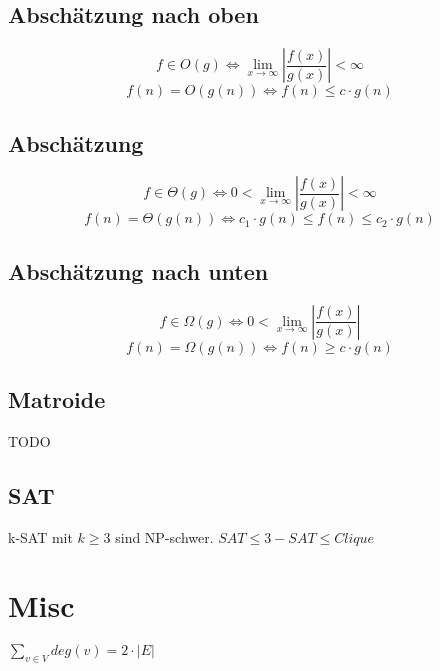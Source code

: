 \documentclass[10pt,a4paper]{article}
\newcommand{\abs}[1]{\ensuremath{\left\vert#1\right\vert}}
\begin{document}
\subsection{Abschätzung nach oben}
\[f \in O(g) \Leftrightarrow \lim_{x \rightarrow \infty} \abs{\frac{f(x)}{g(x)}} < \infty \]
\[f(n) = O(g(n)) \Leftrightarrow f(n) \leq c \cdot g(n)\]
\subsection{Abschätzung}
\[f \in \Theta(g) \Leftrightarrow 0 <\lim_{x \rightarrow \infty} \abs{\frac{f(x)}{g(x)}} < \infty \]
\[f(n) = \Theta(g(n)) \Leftrightarrow c_1 \cdot g(n) \leq f(n) \leq c_2 \cdot g(n)\]
\subsection{Abschätzung nach unten}
\[f \in \Omega(g) \Leftrightarrow 0 < \lim_{x \rightarrow \infty} \abs{\frac{f(x)}{g(x)}} \]
\[f(n) = \Omega(g(n)) \Leftrightarrow f(n) \geq c \cdot g(n)\]
\subsection{Matroide}
TODO
\subsection{SAT}
k-SAT mit $k \geq 3$ sind NP-schwer.
$SAT \leq 3-SAT \leq Clique$
\section{Misc}
$\sum\limits_{v \in V} deg(v) = 2 \cdot |E|$
\end{document}

